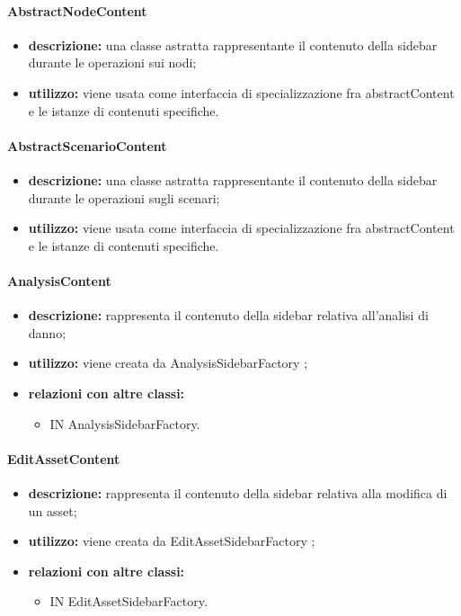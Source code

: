 \paragraph{AbstractNodeContent}
\begin{itemize}
	\item \textbf{descrizione:} una classe astratta rappresentante il contenuto della sidebar durante le operazioni sui nodi;
	\item \textbf{utilizzo:} viene usata come interfaccia di specializzazione fra abstractContent e le istanze di contenuti specifiche.
\end{itemize}
\paragraph{AbstractScenarioContent}
\begin{itemize}
	\item \textbf{descrizione:} una classe astratta rappresentante il contenuto della sidebar durante le operazioni sugli scenari;
	\item \textbf{utilizzo:} viene usata come interfaccia di specializzazione fra abstractContent e le istanze di contenuti specifiche.
\end{itemize}
\paragraph{AnalysisContent}
\begin{itemize}
	\item \textbf{descrizione:} rappresenta il contenuto della sidebar relativa all'analisi di danno;
	\item \textbf{utilizzo:} viene creata da AnalysisSidebarFactory ;
	\item \textbf{relazioni con altre classi:} 
	\begin{itemize}
		\item IN AnalysisSidebarFactory.
	\end{itemize}
\end{itemize}
\paragraph{EditAssetContent}
\begin{itemize}
	\item \textbf{descrizione:} rappresenta il contenuto della sidebar relativa alla modifica di un asset;
	\item \textbf{utilizzo:} viene creata da EditAssetSidebarFactory ;
	\item \textbf{relazioni con altre classi:} 
	\begin{itemize}
		\item IN EditAssetSidebarFactory.
	\end{itemize}
\end{itemize}
